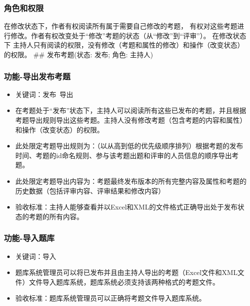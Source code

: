 \documentclass[hyperref, a4paper]{ctexart}
\begin{document}
\hypertarget{ux89d2ux8272ux548cux6743ux9650-2}{%
\subsubsection{角色和权限}\label{ux89d2ux8272ux548cux6743ux9650-2}}

在修改状态下，作者有权阅读所有属于需要自己修改的考题，
有权对这些考题进行修改。作者有权改变处于``修改''考题的状态（从``修改''到``评审''）。
在修改状态下
主持人只有阅读的权限，没有修改（考题和属性的修改）和操作（改变状态）的权限。
\#\# 发布考题(状态: 发布; 角色: 主持人)

\hypertarget{ux529fux80fd-ux5bfcux51faux53d1ux5e03ux8003ux9898}{%
\subsubsection{功能-导出发布考题}\label{ux529fux80fd-ux5bfcux51faux53d1ux5e03ux8003ux9898}}

\begin{itemize}
\item
  关键词：发布~导出
\item
  在考题处于``发布''状态下，主持人可以阅读所有这些已发布的考题，并且根据考题导出规则导出这些考题。主持人没有修改考题（包含考题的内容和属性）和操作（改变状态）的权限。
\item
  此处限定考题导出规则为：（以从高到低的优先级顺序排列）根据考题的发布时间、考题的id命名规则、参与该考题出题和评审的人员信息的顺序导出考题。
\item
  此处限定考题导出内容为：考题最终发布版本的所有完整内容及属性和考题的历史数据（包括评审内容、评审结果和修改内容）
\item
  验收标准：主持人能够查看并以Excel和XML的文件格式正确导出处于发布状态的考题的所有内容。
\end{itemize}

\hypertarget{ux529fux80fd-ux5bfcux5165ux9898ux5e93}{%
\subsubsection{功能-导入题库}\label{ux529fux80fd-ux5bfcux5165ux9898ux5e93}}

\begin{itemize}
\item
  关键词：导入
\item
  题库系统管理员可以将已发布并且由主持人导出的考题（Excel文件和XML文件）文件导入题库系统，题库系统必须支持该两种格式的考题文件。
\item
  验收标准：题库系统管理员可以正确将考题文件导入题库系统。
\end{itemize}
\end{document}
